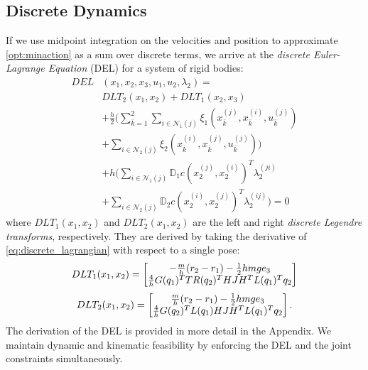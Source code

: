 \documentclass[conference]{IEEEtran}
\begin{document}
\subsection{Discrete Dynamics} \label{sec:discrete_dynamics}
If we use midpoint integration on the velocities and position to approximate 
\eqref{opt:minaction} as a sum over discrete terms, we arrive at the \textit{discrete Euler-
Lagrange Equation} (DEL) for a system of rigid bodies:
\begin{equation} \label{eq:DEL_single}
\begin{aligned}
    DEL&(x_1, x_2, x_3, u_1, u_2, \lambda_2) = \\
    &DLT_2(x_1, x_2) + DLT_1(x_2, x_3) \\
    &+ \frac{h}{2} \Bigg( \sum_{\bar{k} = 1}^{2} 
        \sum_{i \in \mathcal{N}_1(j)} \xi_1\left(x_{\bar{k}}^{(j)}, x_{\bar{k}}^{(i)}, u_{\bar{k}}^{(j)}\right) \\
    & + \sum_{i \in \mathcal{N}_2(j)} \xi_2\left(x_{\bar{k}}^{(i)}, x_{\bar{k}}^{(j)}, u_{\bar{k}}^{(j)}\right)
    \Bigg) \\
    & + h \bigg( \sum_{i \in \mathcal{N}_1(j)} \mathbb{D}_1 c\left(x_2^{(j)}, x_2^{(i)}\right)^T \lambda_2^{(ji)} \\
    & +         \sum_{i \in \mathcal{N}_2(j)} \mathbb{D}_2 c\left(x_2^{(i)}, x_2^{(j)}\right)^T \lambda_2^{(ij)} \bigg) = 0
\end{aligned}
\end{equation}
where $DLT_1(x_1, x_2)$ and $DLT_2(x_1, x_2)$ are the left and right 
\textit{discrete Legendre transforms}, respectively. They are derived by taking the 
derivative of \eqref{eq:discrete_lagrangian} with respect to a single pose:
\begin{equation}
    DLT_1(x_1, x_2) = \begin{bmatrix}
        -\frac{m}{h} (r_2 - r_1) - \frac{1}{2} h m g e_3 \\
        \frac{4}{h} G(q_1)^T T R(q_2)^T H J H^T L(q_1)^T q_2
    \end{bmatrix}
\end{equation}
\begin{equation}
    DLT_2(x_1, x_2) = \begin{bmatrix}
        \frac{m}{h} (r_2 - r_1) - \frac{1}{2} h m g e_3 \\
        \frac{4}{h} G(q_2)^T L(q_1) H J H^T L(q_1)^T q_2
    \end{bmatrix}.
\end{equation}
The derivation of the DEL is provided in more detail in the Appendix. 
We maintain dynamic and kinematic feasibility by enforcing the DEL and the joint constraints 
simultaneously. 
\end{document}
